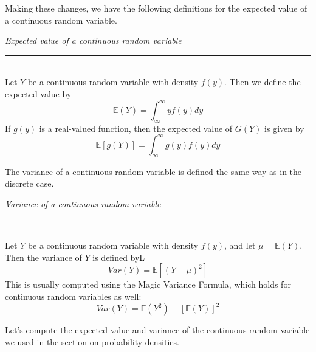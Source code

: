 \documentclass[12pt]{article}
\theoremstyle{definition}
\theoremstyle{remark}
\def\E{{\mathbb E}}
\begin{document}
Making these changes, we have the following definitions for the expected value of a continuous random variable.

\begin{framed}
\emph{Expected value of a continuous random variable}\\
  \rule{\dimexpr{}\fboxrule}{.1pt} \\
Let $Y$ be a continuous random variable with density $f(y)$. Then we define the expected value by
\[
\E(Y) = \int_{\infty}^\infty y f(y) dy
\]
If $g(y)$ is a real-valued function, then the expected value of $G(Y)$ is given by
\[
\E[g(Y)] = \int_{\infty}^\infty g(y) f(y) dy
\]
\end{framed}

The variance of a continuous random variable is defined the same way as in the discrete case.

\begin{framed}
\emph{Variance of a continuous random variable}\\
  \rule{\dimexpr{}\fboxrule}{.1pt} \\
Let $Y$ be a continuous random variable with density $f(y)$, and let $\mu = \E(Y)$. Then the variance of $Y$ is defined byL
\[
Var(Y) = \E[(Y - \mu)^2]
\]
This is usually computed using the Magic Variance Formula, which holds for continuous random variables as well:
\[
Var(Y) = \E(Y^2) - [\E(Y)]^2
\]
\end{framed}

Let's compute the expected value and variance of the continuous random variable we used in the section on probability densities.
\end{document}
